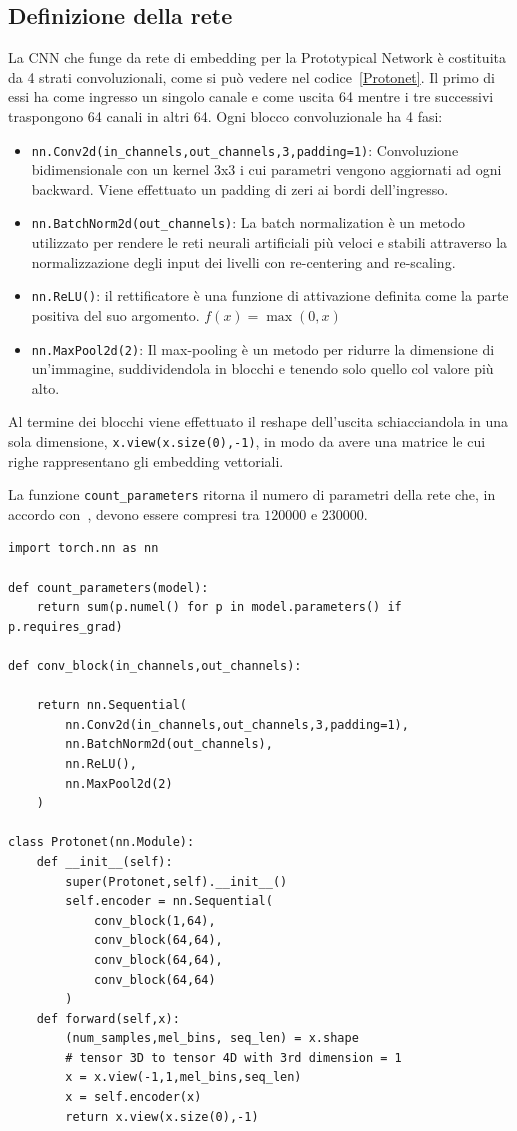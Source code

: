 \documentclass[12pt,a4paper,titlepage]{article}
\begin{document}
\subsection{Definizione della rete}
\label{subsec:definizione_protonet}
La CNN che funge da rete di embedding per la Prototypical Network è costituita da 4 strati convoluzionali, come si può vedere nel codice~\ref{Protonet}. Il primo di essi ha come ingresso un singolo canale e come uscita 64 mentre i tre successivi traspongono 64 canali in altri 64.
Ogni blocco convoluzionale ha 4 fasi:
\begin{itemize}
	\item \texttt{nn.Conv2d(in\_channels,out\_channels,3,padding=1)}: Convoluzione bidimensionale con un kernel 3x3 i cui parametri vengono aggiornati ad ogni backward. Viene effettuato un padding di zeri ai bordi dell'ingresso.
	\item \texttt{nn.BatchNorm2d(out\_channels)}: La batch normalization è un metodo utilizzato per rendere le reti neurali artificiali più veloci e stabili attraverso la normalizzazione degli input dei livelli con re-centering and re-scaling.
	\item \texttt{nn.ReLU()}: il rettificatore è una funzione di attivazione definita come la parte positiva del suo argomento. $f(x)=\max(0,x)$
	\item \texttt{nn.MaxPool2d(2)}: Il max-pooling è un metodo per ridurre la dimensione di un’immagine, suddividendola in blocchi e tenendo solo quello col valore più alto.
\end{itemize}
Al termine dei blocchi viene effettuato il reshape dell'uscita schiacciandola in una sola dimensione, \texttt{x.view(x.size(0),-1)}, in modo da avere una matrice le cui righe rappresentano gli embedding vettoriali.

La funzione \texttt{count\_parameters} ritorna il numero di parametri della rete che, in accordo con~\cite{Salamon:Few-Shot}, devono essere compresi tra $120000$ e $230000$.

\begin{lstlisting}[language=iPython,firstnumber=1, caption=protonet.py, label= Protonet,captionpos=b]
import torch.nn as nn

def count_parameters(model):
    return sum(p.numel() for p in model.parameters() if p.requires_grad)

def conv_block(in_channels,out_channels):

    return nn.Sequential(
        nn.Conv2d(in_channels,out_channels,3,padding=1),
        nn.BatchNorm2d(out_channels),
        nn.ReLU(),
        nn.MaxPool2d(2)
    )

class Protonet(nn.Module):
    def __init__(self):
        super(Protonet,self).__init__()
        self.encoder = nn.Sequential(
            conv_block(1,64),
            conv_block(64,64),
            conv_block(64,64),
            conv_block(64,64)
        )
    def forward(self,x):
        (num_samples,mel_bins, seq_len) = x.shape
        # tensor 3D to tensor 4D with 3rd dimension = 1
        x = x.view(-1,1,mel_bins,seq_len) 
        x = self.encoder(x)
        return x.view(x.size(0),-1)
\end{lstlisting}
\end{document}
